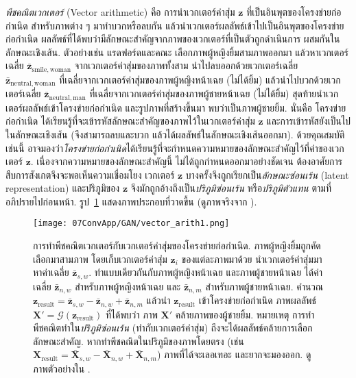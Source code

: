 \textit{พีชคณิตเวกเตอร์} (Vector arithmetic)
คือ การนำเวกเตอร์ค่าสุ่ม $\bm{z}$ ที่เป็นอินพุตของโครงข่ายก่อกำเนิด สำหรับภาพต่าง ๆ มาทำบวกหรือลบกัน
แล้วนำเวกเตอร์ผลลัพธ์เข้าไปเป็นอินพุตของโครงข่ายก่อกำเนิด 
ผลลัพธ์ที่ได้พบว่ามีลักษณะสำคัญจากภาพของเวกเตอร์ที่เป็นตัวถูกดำเนินการ ผสมกันในลักษณะเชิงเส้น.
ตัวอย่างเช่น แรดฟอร์ดและคณะ\cite{DCGAN} เลือกภาพผู้หญิงยิ้มสามภาพออกมา 
แล้วหาเวกเตอร์เฉลี่ย $\bar{\bm{z}}_{\mathrm{smile, woman}}$ จากเวกเตอร์ค่าสุ่มของภาพทั้งสาม
นำไปลบออกด้วยเวกเตอร์เฉลี่ย $\bar{\bm{z}}_{\mathrm{neutral, woman}}$ ที่เฉลี่ยจากเวกเตอร์ค่าสุ่มของภาพผู้หญิงหน้าเฉย (ไม่ได้ยิ้ม)
แล้วนำไปบวกด้วยเวกเตอร์เฉลี่ย $\bar{\bm{z}}_{\mathrm{neutral, man}}$ ที่เฉลี่ยจากเวกเตอร์ค่าสุ่มของภาพผู้ชายหน้าเฉย (ไม่ได้ยิ้ม)
สุดท้ายนำเวกเตอร์ผลลัพธ์เข้าโครงข่ายก่อกำเนิด และรูปภาพที่สร้างขึ้นมา พบว่าเป็นภาพผู้ชายยิ้ม.
นั่นคือ 
โครงข่ายก่อกำเนิด ได้เรียนรู้ที่จะเข้ารหัสลักษณะสำคัญของภาพไว้ในเวกเตอร์ค่าสุ่ม $\bm{z}$
และการเข้ารหัสยังเป็นไปในลักษณะเชิงเส้น (จึงสามารถลบและบวก แล้วได้ผลลัพธ์ในลักษณะเชิงเส้นออกมา).
ด้วยคุณสมบัติเช่นนี้ อาจมองว่า\textit{โครงข่ายก่อกำเนิด}ได้เรียนรู้ที่จะกำหนดความหมายของลักษณะสำคัญไว้ที่ค่าของเวกเตอร์ $\bm{z}$.
เนื่องจากความหมายของลักษณะสำคัญนี้ ไม่ได้ถูกกำหนดออกมาอย่างชัดเจน ต้องอาศัยการสืบการสังเกตจึงจะพอเห็นความเชื่อมโยง
เวกเตอร์ $\bm{z}$ บางครั้งจึงถูกเรียกเป็น\textit{ลักษณะซ่อนเร้น} (latent representation)
และปริภูมิของ $\bm{z}$ จึงมักถูกอ้างถึงเป็น\textit{ปริภูมิซ่อนเร้น} หรือ\textit{ปริภูมิตัวแทน} ตามที่อภิปรายไปก่อนหน้า.
รูป~\ref{fig: conv app vector arith} แสดงภาพประกอบที่วาดขึ้น (ดูภาพจริงจาก \cite{DCGAN}).

%
\begin{figure}
	\begin{center}
		\texttt{[image: 07ConvApp/GAN/vector\_arith1.png]}
		\caption[การทำพีชคณิตเวกเตอร์กับเวกเตอร์ค่าสุ่มของโครงสร้างปรปักษ์เชิงสร้าง]{การทำพีชคณิตเวกเตอร์กับเวกเตอร์ค่าสุ่มของโครงข่ายก่อกำเนิด.
		ภาพผู้หญิงยิ้มถูกคัดเลือกมาสามภาพ โดยเก็บเวกเตอร์ค่าสุ่ม $\bm{z}_i$ ของแต่ละภาพมาด้วย
		นำเวกเตอร์ค่าสุ่มมาหาค่าเฉลี่ย $\bar{\bm{z}}_{s,w}$.
		ทำแบบเดียวกันกับภาพผู้หญิงหน้าเฉย และภาพผู้ชายหน้าเฉย
		ได้ค่าเฉลี่ย $\bar{\bm{z}}_{n,w}$ สำหรับภาพผู้หญิงหน้าเฉย และ $\bar{\bm{z}}_{n,m}$ สำหรับภาพผู้ชายหน้าเฉย.
		คำนวณ $\bm{z}_{\mathrm{result}} = \bar{\bm{z}}_{s,w} - \bar{\bm{z}}_{n,w} + \bar{\bm{z}}_{n,m}$
		แล้วนำ $\bm{z}_{\mathrm{result}}$ เข้าโครงข่ายก่อกำเนิด ภาพผลลัพธ์ $\bm{X}' = \mathcal{G}(\bm{z}_{\mathrm{result}})$ ที่ได้พบว่า ภาพ $\bm{X}'$ คล้ายภาพของผู้ชายยิ้ม.
		หมายเหตุ การทำพีชคณิตทำใน\textit{ปริภูมิซ่อนเร้น} (ทำกับเวกเตอร์ค่าสุ่ม) ถึงจะได้ผลลัพธ์คล้ายการเลือกลักษณะสำคัญ.
		หากทำพีชคณิตในปริภูมิของภาพโดยตรง (เช่น $\bm{X}_{\mathrm{result}} = \bar{\bm{X}}_{s,w} - \bar{\bm{X}}_{n,w} + \bar{\bm{X}}_{n,m}$) ภาพที่ได้จะเลอเทอะ และยากจะมองออก.
		ดูภาพตัวอย่างใน \cite{DCGAN}.
		}
		\label{fig: conv app vector arith}
	\end{center}
\end{figure}
%


